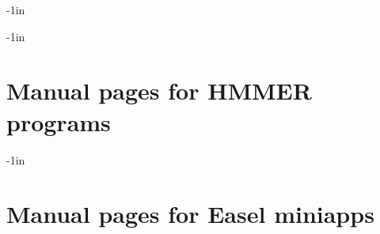 \documentclass[notoc]{tufte-book}    %
\begin{document}
\setcounter{tocdepth}{2}             %

\maketitle



\begin{adjustwidth}{}{-1in}          %
\tableofcontents                     
\end{adjustwidth}







\begin{adjustwidth}{}{-1in}   
\chapter{Manual pages for HMMER programs}             

\end{adjustwidth}

\begin{adjustwidth}{}{-1in}   
\chapter{Manual pages for Easel miniapps}             

\end{adjustwidth}




\label{manualend}

% 
\end{document}
